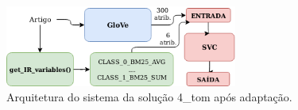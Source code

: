 \begin{figure}[h]
    \centering
    \caption{Arquitetura do sistema da solução 4\_tom após adaptação.}
    \begin{center}
        \includegraphics[width=0.68\textwidth]{img/4-tom-arquitetura-com-ri.png}
    \end{center}
    \vspace{-0.5cm}
    \label{fig:4-tom-arquitetura-com-ri}
\end{figure}